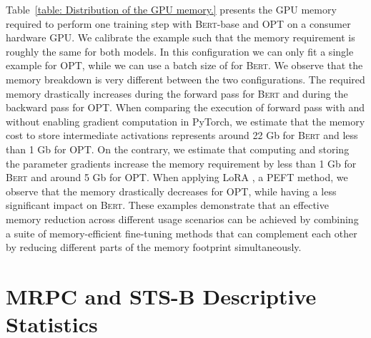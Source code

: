 

Table~\ref{table: Distribution of the GPU memory.} presents the GPU memory required to perform one training step with \textsc{Bert}-base \citep{devlin_19} and OPT \citep{zhang_22} on a consumer hardware GPU. We calibrate the example such that the memory requirement is roughly the same for both models. In this configuration we can only fit a single example for OPT, while we can use a batch size of  for \textsc{Bert}. We observe that the memory breakdown is very different between the two configurations. The required memory drastically increases during the forward pass for \textsc{Bert} and during the backward pass for OPT. When comparing the execution of forward pass with and without enabling gradient computation in PyTorch, we estimate that the memory cost to store intermediate activations represents around 22 Gb for \textsc{Bert} and less than 1 Gb for OPT. On the contrary, we estimate that computing and storing the parameter gradients increase the memory requirement by less than 1 Gb for \textsc{Bert} and around 5 Gb for OPT. When applying LoRA \citep{hu_22}, a PEFT method, we observe that the memory drastically decreases for OPT, while having a less significant impact on \textsc{Bert}.
These examples demonstrate that an effective memory reduction across different usage scenarios
can be achieved by combining a suite of memory-efficient fine-tuning methods that can complement each other by reducing different parts of the memory footprint simultaneously.






































\section{MRPC and STS-B Descriptive Statistics}\label{app:stats_desc}

